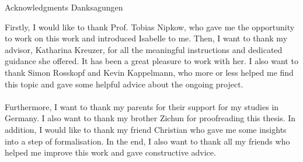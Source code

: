 \makeatletter
{}
{}
{}
\makeatother
\thispagestyle{empty}

\vspace*{20mm}

\begin{center}
\makeatletter
{}
{ Acknowledgments}
{ Danksagungen}
\makeatother
\end{center}

\vspace{10mm}

Firstly, I would like to thank Prof. Tobias Nipkow, who gave me the opportunity to work on this work 
and introduced Isabelle to me. Then, I want to thank my advisor, Katharina Kreuzer,
for all the meaningful instructions and dedicated guidance she offered. 
It has been a great pleasure to work with her. 
I also want to thank Simon Rosskopf and Kevin Kappelmann, who more or less helped me find this topic 
and gave some helpful advice about the ongoing project. \\\\
Furthermore, I want to thank my parents for their support for my studies in Germany. 
I also want to thank my brother Zichun for proofreading this thesis. 
In addition, I would like to thank my friend Christian who gave me some insights into a step of formalisation.
In the end, I also want to thank all my friends who helped me improve this work and gave constructive advice.

\cleardoublepage{}
